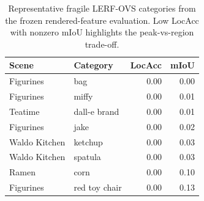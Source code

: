 \begin{table}[t]
\centering
\caption{Representative fragile LERF-OVS categories from the frozen rendered-feature evaluation. Low LocAcc with nonzero mIoU highlights the peak-vs-region trade-off.}
\label{tab:failure_analysis}
\begin{tabular}{llrr}
\toprule
Scene & Category & LocAcc & mIoU \\
\midrule
Figurines & bag & 0.00 & 0.00 \\
Figurines & miffy & 0.00 & 0.01 \\
Teatime & dall-e brand & 0.00 & 0.01 \\
Figurines & jake & 0.00 & 0.02 \\
Waldo Kitchen & ketchup & 0.00 & 0.03 \\
Waldo Kitchen & spatula & 0.00 & 0.03 \\
Ramen & corn & 0.00 & 0.10 \\
Figurines & red toy chair & 0.00 & 0.13 \\
\bottomrule
\end{tabular}
\end{table}

